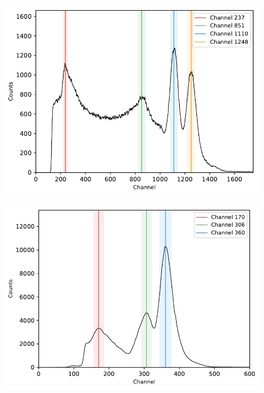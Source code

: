 %
\begin{center}
    \begin{adjustbox}{max width=\linewidth, keepaspectratio}
        \includegraphics[]{pdf/60Co}
    \end{adjustbox}
    \label{fig:60CoDecayScheme}
\end{center}
%
\begin{center}
    \begin{adjustbox}{max width=\linewidth, keepaspectratio}
        \includegraphics[]{pdf/133Ba}
    \end{adjustbox}
    \label{fig:133BaDecayScheme}
\end{center}
